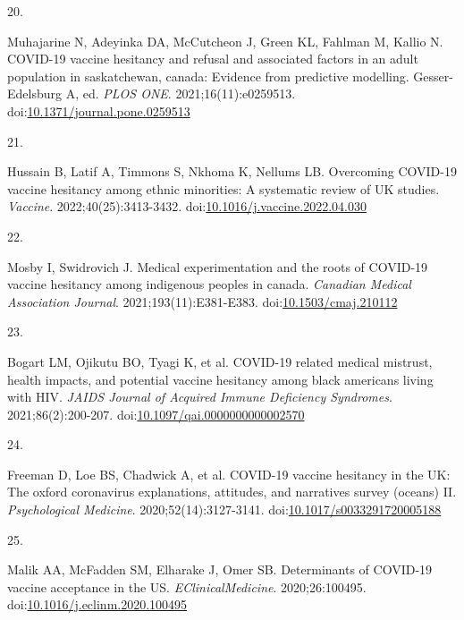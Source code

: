 \documentclass[
]{article}
\newlength{\cslhangindent}
\newlength{\csllabelwidth}
\newlength{\cslentryspacingunit} %
\newenvironment{CSLReferences}[2] %
 {%
  \setlength{\parindent}{0pt}
  \ifodd #1
  \let\oldpar\par
  \def\par{\hangindent=\cslhangindent\oldpar}
  \fi
  \setlength{\parskip}{#2\cslentryspacingunit}
 }%
 {}
\newcommand{\CSLLeftMargin}[1]{\parbox[t]{\csllabelwidth}{#1}}
\newcommand{\CSLRightInline}[1]{\parbox[t]{\linewidth - \csllabelwidth}{#1}\break}
\begin{document}
\begin{CSLReferences}{0}{0}
\leavevmode{}%
\CSLLeftMargin{20. }%
\CSLRightInline{Muhajarine N, Adeyinka DA, McCutcheon J, Green KL,
Fahlman M, Kallio N. {COVID}-19 vaccine hesitancy and refusal and
associated factors in an adult population in saskatchewan, canada:
Evidence from predictive modelling. Gesser-Edelsburg A, ed. \emph{{PLOS}
{ONE}}. 2021;16(11):e0259513.
doi:\href{https://doi.org/10.1371/journal.pone.0259513}{10.1371/journal.pone.0259513}}

\leavevmode{}%
\CSLLeftMargin{21. }%
\CSLRightInline{Hussain B, Latif A, Timmons S, Nkhoma K, Nellums LB.
Overcoming {COVID}-19 vaccine hesitancy among ethnic minorities: A
systematic review of {UK} studies. \emph{Vaccine}.
2022;40(25):3413-3432.
doi:\href{https://doi.org/10.1016/j.vaccine.2022.04.030}{10.1016/j.vaccine.2022.04.030}}

\leavevmode{}%
\CSLLeftMargin{22. }%
\CSLRightInline{Mosby I, Swidrovich J. Medical experimentation and the
roots of {COVID}-19 vaccine hesitancy among indigenous peoples in
canada. \emph{Canadian Medical Association Journal}.
2021;193(11):E381-E383.
doi:\href{https://doi.org/10.1503/cmaj.210112}{10.1503/cmaj.210112}}

\leavevmode{}%
\CSLLeftMargin{23. }%
\CSLRightInline{Bogart LM, Ojikutu BO, Tyagi K, et al. {COVID}-19
related medical mistrust, health impacts, and potential vaccine
hesitancy among black americans living with {HIV}. \emph{{JAIDS} Journal
of Acquired Immune Deficiency Syndromes}. 2021;86(2):200-207.
doi:\href{https://doi.org/10.1097/qai.0000000000002570}{10.1097/qai.0000000000002570}}

\leavevmode{}%
\CSLLeftMargin{24. }%
\CSLRightInline{Freeman D, Loe BS, Chadwick A, et al. {COVID}-19 vaccine
hesitancy in the {UK}: The oxford coronavirus explanations, attitudes,
and narratives survey (oceans) {II}. \emph{Psychological Medicine}.
2020;52(14):3127-3141.
doi:\href{https://doi.org/10.1017/s0033291720005188}{10.1017/s0033291720005188}}

\leavevmode{}%
\CSLLeftMargin{25. }%
\CSLRightInline{Malik AA, McFadden SM, Elharake J, Omer SB. Determinants
of {COVID}-19 vaccine acceptance in the {US}.
\emph{{EClinicalMedicine}}. 2020;26:100495.
doi:\href{https://doi.org/10.1016/j.eclinm.2020.100495}{10.1016/j.eclinm.2020.100495}}


\end{CSLReferences}
\end{document}
